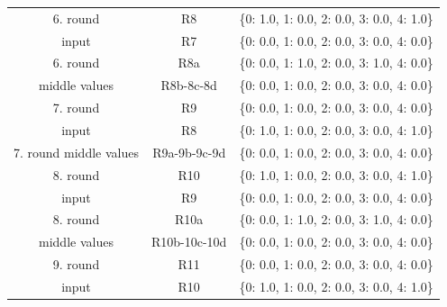 \begin{table}[H]
\begin{tabular}{|c|c|c|}
        \hline
        6. round  & R8 & \{0: 1.0, 1: 0.0, 2: 0.0, 3: 0.0, 4: 1.0\} \\
        input     & R7 & \{0: 0.0, 1: 0.0, 2: 0.0, 3: 0.0, 4: 0.0\} \\
        \hline
        6. round  & R8a & \{0: 0.0, 1: 1.0, 2: 0.0, 3: 1.0, 4: 0.0\} \\
        middle values & R8b-8c-8d & \{0: 0.0, 1: 0.0, 2: 0.0, 3: 0.0, 4: 0.0\} \\
                     
        \hline
        7. round  & R9 & \{0: 0.0, 1: 0.0, 2: 0.0, 3: 0.0, 4: 0.0\} \\
        input     & R8 & \{0: 1.0, 1: 0.0, 2: 0.0, 3: 0.0, 4: 1.0\} \\
        \hline
        7. round middle values & R9a-9b-9c-9d & \{0: 0.0, 1: 0.0, 2: 0.0, 3: 0.0, 4: 0.0\} \\
        \hline
        8. round  & R10 & \{0: 1.0, 1: 0.0, 2: 0.0, 3: 0.0, 4: 1.0\} \\
        input      & R9  & \{0: 0.0, 1: 0.0, 2: 0.0, 3: 0.0, 4: 0.0\} \\
        \hline
        8. round  & R10a & \{0: 0.0, 1: 1.0, 2: 0.0, 3: 1.0, 4: 0.0\} \\
        middle values & R10b-10c-10d & \{0: 0.0, 1: 0.0, 2: 0.0, 3: 0.0, 4: 0.0\} \\
                      
        \hline
        9. round & R11 & \{0: 0.0, 1: 0.0, 2: 0.0, 3: 0.0, 4: 0.0\} \\
        input     & R10 & \{0: 1.0, 1: 0.0, 2: 0.0, 3: 0.0, 4: 1.0\} \\
        \hline
    \end{tabular}
    
    \label{tab:RelatedKeyDif}
\end{table}






